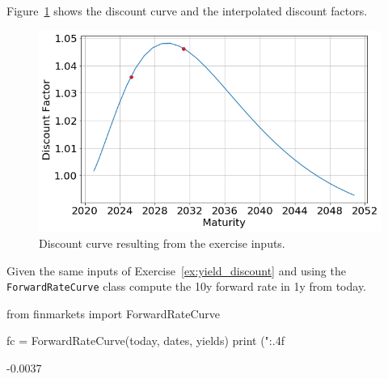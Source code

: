 \begin{solution}
Figure~\ref{fig:ex_discount} shows the discount curve and the interpolated discount factors.

\begin{figure}[htpb]
\centering
\includegraphics[width=0.7\linewidth]{figures/ex_discount}
\caption{Discount curve resulting from the exercise inputs.}
\label{fig:ex_discount}
\end{figure}
\end{solution}

%
%

\begin{question}
Given the same inputs of Exercise~\ref{ex:yield_discount} and using the \texttt{ForwardRateCurve} class compute the 10y forward rate in 1y from today. 
\end{question}

\cprotEnv\begin{solution}
\begin{ipython}
from finmarkets import ForwardRateCurve

fc = ForwardRateCurve(today, dates, yields)
print ("{:.4f}%
\end{ipython}
\begin{ioutput}
-0.0037%
\end{ioutput}
\end{solution}

